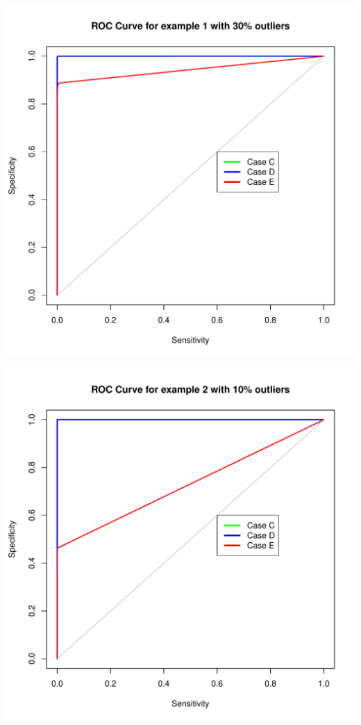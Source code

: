 \documentclass{article}\usepackage[]{graphicx}\usepackage[]{color}
\makeatletter
\def\maxwidth{ %
  \ifdim\Gin@nat@width>\linewidth
    \linewidth
  \else
    \Gin@nat@width
  \fi
}
\newenvironment{knitrout}{}{} %
\makeatother
\begin{document}
\begin{knitrout}
\color{fgcolor}
\includegraphics[width=\maxwidth]{figure/unnamed-chunk-4-1} 

\end{knitrout}

\begin{knitrout}
\color{fgcolor}
\includegraphics[width=\maxwidth]{figure/unnamed-chunk-5-1} 

\end{knitrout}
\end{document}
